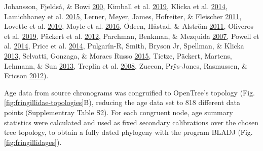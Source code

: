 \documentclass[english,man]{apa6}
\begin{document}
\begin{minipage}{18.2cm}
{Johansson, Fjeldså, \& Bowi \protect\hyperlink{ref-johansson2008phylogenetic}{200},
Kimball et al. \protect\hyperlink{ref-kimball2019phylogenomic}{2019},
Klicka et al. \protect\hyperlink{ref-klicka2014comprehensive}{2014},
Lamichhaney et al. \protect\hyperlink{ref-lamichhaney2015evolution}{2015},
Lerner, Meyer, James, Hofreiter, \& Fleischer \protect\hyperlink{ref-lerner2011multilocus}{2011},
Lovette et al. \protect\hyperlink{ref-lovette2010comprehensive}{2010},
Moyle et al. \protect\hyperlink{ref-moyle2016tectonic}{2016},
Ödeen, Håstad, \& Alström \protect\hyperlink{ref-odeen2011evolution}{2011},
Oliveros et al. \protect\hyperlink{ref-oliveros2019earth}{2019},
Päckert et al. \protect\hyperlink{ref-packert2012horizontal}{2012},
Parchman, Benkman, \& Mezquida \protect\hyperlink{ref-parchman2007coevolution}{2007},
Powell et al. \protect\hyperlink{ref-powell2014comprehensive}{2014},
  Price et al. \protect\hyperlink{ref-price2014niche}{2014},
  Pulgarín-R, Smith, Bryson Jr, Spellman, \& Klicka \protect\hyperlink{ref-pulgarin2013multilocus}{2013},
  Selvatti, Gonzaga, \& Moraes Russo \protect\hyperlink{ref-selvatti2015paleogene}{2015},
  Tietze, Päckert, Martens, Lehmann, \& Sun \protect\hyperlink{ref-tietze2013complete}{2013},
  Treplin et al. \protect\hyperlink{ref-treplin2008molecular}{2008},
  Zuccon, Prŷs-Jones, Rasmussen, \& Ericson \protect\hyperlink{ref-zuccon2012phylogenetic}{2012}).}
\label{fig:fringillidae-topologies}
\end{minipage}

Age data from source chronograms was congruified to OpenTree's topology (Fig. \ref{fig:fringillidae-topologies}B), reducing the age data set to 818 different data points (Supplementray Table S2). For each congruent node, age summary statistics were calculated and used as fixed secondary calibrations over the chosen tree topology, to obtain a fully dated phylogeny with the program BLADJ (Fig. \ref{fig:fringillidages}).
\end{document}
